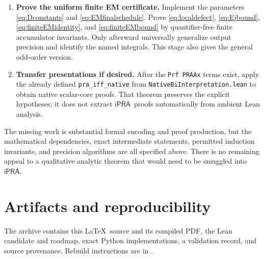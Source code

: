 \documentclass[11pt]{article}
\theoremstyle{definition}
\newcommand{\ipra}{\ensuremath{\mathsf{iPRA}}}
\newcommand{\code}[1]{\texttt{#1}}
\begin{document}
\begin{enumerate}
\item \textbf{Prove the uniform finite EM certificate.}
Implement the parameters \eqref{eq:Dconstants} and
\eqref{eq:EMfinalschedule}.  Prove
\eqref{eq:localdefect}, \eqref{eq:Ejbound},
\eqref{eq:finiteEMidentity}, and \eqref{eq:finiteEMbound}
by quantifier-free finite accumulator invariants.  Only afterward
universally generalize output precision and identify the named
integrals.  This stage also gives the general odd-order version.

\item \textbf{Transfer presentations if desired.}
After the \code{Prf PRAAx} terms exist, apply the already defined
\code{pra\_iff\_native} from
\code{NativeBiInterpretation.lean} to obtain native scalar-core
proofs.  That theorem preserves the explicit hypotheses; it does
not extract \ipra\ proofs automatically from ambient Lean analysis.
\end{enumerate}

The missing work is substantial formal encoding and proof production,
but the mathematical dependencies, exact intermediate statements,
permitted induction invariants, and precision algorithms are all
specified above.  There is no remaining appeal to a qualitative
analytic theorem that would need to be smuggled into \ipra.

\section{Artifacts and reproducibility}\label{sec:artifacts}

The archive contains this \LaTeX\ source and its compiled PDF, the
Lean candidate and roadmap, exact Python implementations, a validation
record, and source provenance.  Rebuild instructions are in
.
\end{document}
